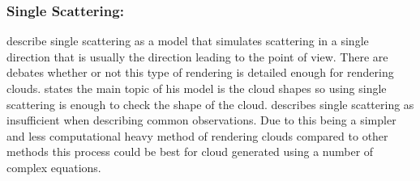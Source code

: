 \subsubsection{Single Scattering:}
\label{sec:single}
\citet*{MHarris01} describe single scattering as a model that simulates scattering in a single direction that is usually the direction leading to the point of view.
There are debates whether or not this type of rendering is detailed enough for rendering clouds.
\citet{Miyazaki01} states the main topic of his model is the cloud shapes so using single scattering is enough to check the shape of the cloud.
\citet{CBohren87} describes single scattering as insufficient when describing common observations.
Due to this being a simpler and less computational heavy method of rendering clouds compared to other methods this process could be best for cloud generated using a number of complex equations.